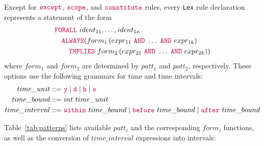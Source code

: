 \documentclass[runningheads]{llncs}
\newcommand{\Lex}{\texttt{Lex}}
\newcommand{\kw}[1]{{\color{purple}\texttt{#1}}}
\begin{document}
Except for $\kw{except}$, $\kw{scope}$, and $\kw{constitute}$ rules, %
every \Lex{} rule declaration represents a statement of the form
\begin{align*}
  &\kw{FORALL}~ident_{11},\dots,ident_{1n}. \\
  &\quad\kw{ALWAYS} (
    form_1 \left(expr_{11}~\kw{AND}~\ldots~\kw{AND}~expr_{1k}\right)\\
    &\qquad \kw{IMPLIES}~
    form_2 \left( expr_{21}~\kw{AND}~\ldots~\kw{AND}~expr_{2k} \right)
  )
\end{align*}
where $form_1$ and $form_2$ are determined by $patt_1$ and $patt_2$, respectively. These options use the following
grammars for time and time intervals:
\begin{align*}
  time\_unit ::= &~\kw{y} \mid \kw{d} \mid \kw{h} \mid \kw{s}  \\
  time\_bound ::= &~ int~time\_unit \\
  time\_interval ::= &~ \kw{within}~time\_bound \mid \kw{before}~time\_bound \mid \kw{after}~time\_bound
\end{align*}

Table~\ref{tab:patterns} lists available $patt_i$ and the corresponding $form_i$ functions, as
well as the conversion of $time\_interval$ expressions into intervals:
\end{document}
